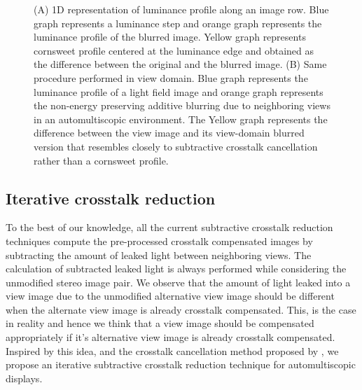 \begin{figure}[htbp]
    \caption{(A) 1D representation of luminance profile along an image row. Blue graph represents a luminance step and orange graph represents the luminance profile of the blurred image. Yellow graph represents cornsweet profile centered at the luminance edge and obtained as the difference between the original and the blurred image.  (B) Same procedure performed in view domain. Blue graph represents the luminance profile of a light field image and orange graph represents the non-energy preserving additive blurring due to neighboring views in an automultiscopic environment. The Yellow graph represents the difference between the view image and its view-domain blurred version that resembles closely to subtractive crosstalk cancellation rather than a cornsweet profile.\label{fig:why_no_cornsweet}}
\end{figure}

\subsection{Iterative crosstalk reduction}

To the best of our knowledge, all the current subtractive crosstalk reduction techniques compute the pre-processed crosstalk compensated images by subtracting the amount of leaked light between neighboring views. The calculation of subtracted leaked light is always performed while considering the unmodified stereo image pair. We observe that the amount of light leaked into a view image due to the unmodified alternative view image should be different when the alternate view image is already crosstalk compensated. This, is the case in reality and hence we think that a view image should be compensated appropriately if it's alternative view image is already crosstalk compensated. Inspired by this idea, and the crosstalk cancellation method proposed by \cite{konrad2000cancellation}, we propose an iterative subtractive crosstalk reduction technique for automultiscopic displays.


